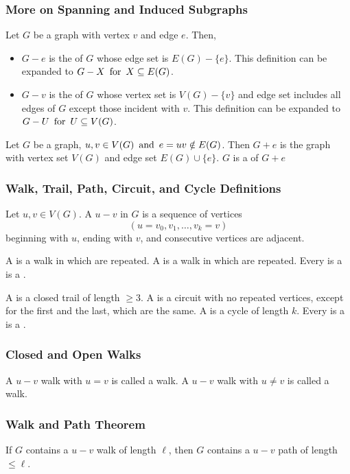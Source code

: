 \subsubsection*{More on Spanning and Induced Subgraphs}
Let $G$ be a graph with vertex $v$ and edge $e$. Then,
\begin{itemize}
    \item $G-e$ is the  of $G$ whose edge set is $E(G)-\{e\}$. 
        \subitem This definition can be expanded to $G-X \operatorname{~\text{for}~} X \subseteq E(G)$.
    \item $G-v$ is the  of $G$ whose vertex set is $V(G) - \{v\}$ and edge set includes all edges of $G$ except those incident with $v$. 
        \subitem This definition can be expanded to $G-U \operatorname{~\text{for}~} U \subseteq V(G)$.
\end{itemize}
Let $G$ be a graph, $u,v \in V(G) \operatorname{~\text{and}~} e = uv \notin E(G)$. Then $G+e$ is the graph with vertex set $V(G)$ and edge set $E(G) \cup \{e\}$. $G$ is a  of $G+e$

\subsubsection*{Walk, Trail, Path, Circuit, and Cycle Definitions}
Let $u,v \in V(G)$. A $u-v$  in $G$ is a sequence of vertices
\[
    (u = v_0, v_1, \ldots, v_k = v)
\]
beginning with $u$, ending with $v$, and consecutive vertices are adjacent. 

A  is a walk in which  are repeated. A  is a walk in which  are repeated. Every  is a  is a .

A  is a closed trail of length $\ge 3$. A  is a circuit with no repeated vertices, except for the first and the last, which are the same. A  is a cycle of length $k$. Every  is a  is a .

\subsubsection*{Closed and Open Walks}
A $u-v$ walk with $u=v$ is called a  walk. A $u-v$ walk with $u \neq v$ is called a  walk.

\subsubsection*{Walk and Path Theorem}
If $G$ contains a $u-v$ walk of length $\ell$, then $G$ contains a $u-v$ path of length $\leq \ell$.

